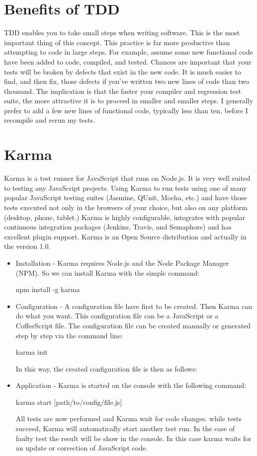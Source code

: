 \documentclass[11pt]{article}
\begin{document}
\section{Benefits of TDD}

TDD enables you to take small steps when writing software. This is the most important thing of this concept. This practice is far more productive than attempting to code in large steps. For example, assume some new functional code have been added to code, compiled, and tested. Chances are important that your tests will be broken by defects that exist in the new code. It is much easier to find, and then fix, those defects if you've written two new lines of code than two thousand. The implication is that the faster your compiler and regression test suite, the more attractive it is to proceed in smaller and smaller steps. I generally prefer to add a few new lines of functional code, typically less than ten, before I recompile and rerun my tests.


\section{Karma}

Karma is a test runner for JavaScript that runs on Node.js. It is very well suited to testing any JavaScript projects. Using Karma to run tests using one of many popular JavaScript testing suites (Jasmine, QUnit, Mocha, etc.) and have those tests executed not only in the browsers of your choice, but also on any platform (desktop, phone, tablet.) Karma is highly configurable, integrates with popular continuous integration packages (Jenkins, Travis, and Semaphore) and has excellent plugin support. Karma is an Open Source distribution and actually in the version 1.0.

\begin{itemize}
\item Installation - Karma requires Node.js and the Node Package Manager (NPM). So we can install Karma with the simple command:

\textdollar{} npm install -g karma
\item Configuration - A configuration file have first to be created. Then Karma can do what you want. This configuration file can be a JavaScript or a CoffeeScript file. The configuration file can be created manually or generated step by step via the command line:

\textdollar{} karma init

In this way, the created configuration file is then as follows:
\item Application - Karma is started on the console with the following command:

\textdollar{} karma start [path/to/config/file.js]

All tests are now performed and Karma wait for code changes. while tests succeed, Karma will automatically start another test run. In the case of faulty test the result will be show in the console. In this case karma waits for an update or correction of JavaScript code.
\end{itemize}
\end{document}
